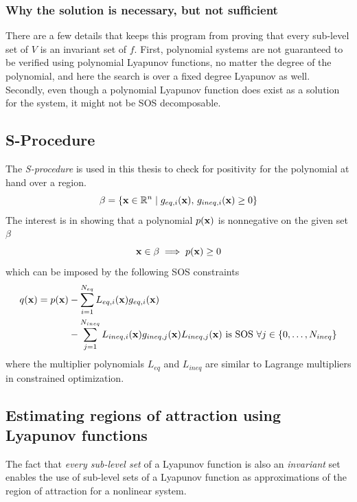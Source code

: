 \subsubsection{Why the solution is necessary, but not sufficient}

There are a few details that keeps this program from proving that every
sub-level set of \(V\) is an invariant set of \(f\). First, polynomial systems
are not guaranteed to be verified using polynomial Lyapunov functions, no matter
the degree of the polynomial, and here the search is over a fixed degree
Lyapunov as well. Secondly, even though a polynomial Lyapunov function does
exist as a solution for the system, it might not be \ac{SOS} decomposable.

\subsection{S-Procedure}
\label{sec:s-procedure}

The \textit{S-procedure} is used in this thesis to check for positivity for the
polynomial at hand over a region.
\[
  \beta = \lbrace\mathbf{x} \in \mathbb{R}^n \mid g_{eq,i}(\mathbf{x}),\,g_{ineq,i}(\mathbf{x})
    \geq 0\rbrace
\]
The interest is in showing that a polynomial \(p(\mathbf{x})\) is nonnegative on
the given set \(\beta\) \ie
\[
  \mathbf{x} \in \beta \implies p(\mathbf{x}) \geq 0
\]
which can be imposed by the following SOS constraints
\begin{align*}
  q(\mathbf{x}) = p(\mathbf{x}) &- \sum_{i=1}^{N_{eq}}L_{eq,i}(\mathbf{x})g_{eq,i}(\mathbf{x}) \\ &-
                                                                                            \sum_{j=1}^{N_{ineq}}L_{ineq,i}(\mathbf{x})g_{ineq,j}(\mathbf{x})
                                                                                            L_{ineq,j}(\mathbf{x}) \text{ is SOS } \forall j \in \lbrace0,\ldots,N_{ineq}\rbrace
\end{align*} 
where the multiplier polynomials \(L_{eq}\) and \(L_{ineq}\) are similar to
Lagrange multipliers in constrained optimization.

\subsection{Estimating regions of attraction using Lyapunov functions}

The fact that \textit{every sub-level set} of a Lyapunov function is also an
\textit{invariant} set enables the use of sub-level sets of a Lyapunov function
as approximations of the region of attraction for a nonlinear system.

